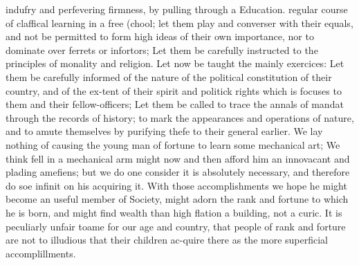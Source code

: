 indufry and perfevering firmness, by pulling through a Education. regular course of claffical learning in a free (chool; let them play and converser with their equals, and not be permitted to form high ideas of their own importance, nor to dominate over ferrets or infortors; Let them be carefully instructed to the principles of monality and religion. Let now be taught the mainly exercices: Let them be carefully informed of the nature of the political constitution of their country, and of the ex-tent of their spirit and politick rights which is focuses to them and their fellow-officers; Let them be called to trace the annals of mandat through the records of history; to mark the appearances and operations of nature, and to amute themselves by purifying thefe to their general earlier. We lay nothing of causing the young man of fortune to learn some mechanical art; We think fell in a mechanical arm might now and then afford him an innovacant and plading amefiens; but we do one consider it is absolutely necessary, and therefore do soe infinit on his acquiring it. With those accomplishments we hope he might become an useful member of Society, might adorn the rank and fortune to which he is born, and might find wealth than high flation a building, not a curic. It is peculiarly unfair toame for our age and country, that people of rank and forture are not to illudious that their children ac-quire there as the more superficial accomplillments.\par\medskip
